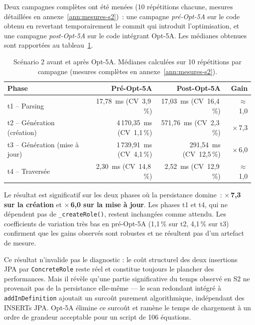 Deux campagnes complètes ont été menées (10 répétitions chacune,
mesures détaillées en annexe~\ref{ann:mesures-s2})~: une campagne
\emph{pré-Opt-5A} sur le code obtenu en revertant temporairement le
commit qui introduit l'optimisation, et une campagne \emph{post-Opt-5A}
sur le code intégrant Opt-5A. Les médianes obtenues sont rapportées au
tableau~\ref{tab:scenario2-opt5a}.

\begin{table}[h]
\centering
\caption{Scénario 2 avant et après Opt-5A. Médianes calculées sur 10
répétitions par campagne (mesures complètes en
annexe~\ref{ann:mesures-s2}).}
\label{tab:scenario2-opt5a}
\begin{tabular}{lrrr}
\hline
\textbf{Phase} & \textbf{Pré-Opt-5A} & \textbf{Post-Opt-5A} & \textbf{Gain} \\
\hline
t1 -- Parsing                & 17,78~ms (CV~3,9\,\%)    & 17,03~ms (CV~16,4\,\%) & $\approx$~1,0 \\
t2 -- Génération (création)  & 4\,170,35~ms (CV~1,1\,\%) & 571,76~ms (CV~2,3\,\%) & $\times$\,7,3 \\
t3 -- Génération (mise à jour) & 1\,739,91~ms (CV~4,1\,\%) & 291,54~ms (CV~12,5\,\%) & $\times$\,6,0 \\
t4 -- Traversée              & 2,30~ms (CV~14,8\,\%)    & 2,52~ms (CV~12,9\,\%) & $\approx$~1,0 \\
\hline
\end{tabular}
\end{table}

Le résultat est significatif sur les deux phases où la persistance domine~:
\textbf{$\times$\,7,3 sur la création} et \textbf{$\times$\,6,0 sur la
mise à jour}. Les phases t1 et t4, qui ne dépendent pas de
\texttt{\_createRole()}, restent inchangées comme attendu. Les
coefficients de variation très bas en pré-Opt-5A (1,1\,\% sur t2,
4,1\,\% sur t3) confirment que les gains observés sont robustes et ne
résultent pas d'un artefact de mesure.

Ce résultat n'invalide pas le diagnostic : le coût structurel des deux
insertions JPA par \texttt{ConcreteRole} reste réel et constitue toujours
le plancher des performances. Mais il révèle qu'une partie significative
du temps observé en S2 ne provenait pas de la persistance elle-même ---
le scan redondant intégré à \texttt{addInDefinition} ajoutait un surcoût
purement algorithmique, indépendant des INSERTs JPA. Opt-5A élimine ce
surcoût et ramène le temps de chargement à un ordre de grandeur
acceptable pour un script de 106 équations.

